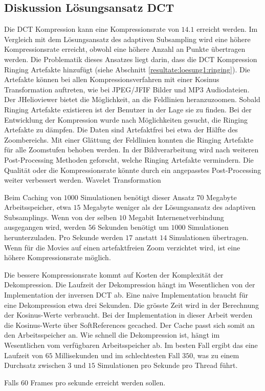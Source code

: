 \subsection{Diskussion Lösungsansatz DCT}
Die DCT Kompression kann eine Kompressionsrate von $14.1$ erreicht werden. Im Vergleich mit dem Lösungsansatz des adaptiven Subsampling wird eine höhere Kompressionsrate erreicht, obwohl eine höhere Anzahl an Punkte übertragen werden. Die Problematik dieses Ansatzes liegt darin, dass die DCT Kompression Ringing Artefakte hinzufügt (siehe Abschnitt \ref{resultate:loesung1:ringing}). Die Artefakte können bei allen Kompressionsverfahren mit einer Kosinus Transformation auftreten, wie bei JPEG/JFIF Bilder und MP3 Audiodateien. Der JHelioviewer bietet die Möglichkeit, an die Feldlinien heranzuzoomen. Sobald Ringing Artefakte existieren ist der Benutzer in der Lage sie zu finden. Bei der Entwicklung der Kompression wurde nach Möglichkeiten gesucht, die Ringing Artefakte zu dämpfen. Die Daten sind Artefaktfrei bei etwa der Hälfte des Zoombereichs. Mit einer Glättung der Feldlinien konnten die Ringing Artefakte für alle Zoomstufen behoben werden. In der Bildverarbeitung wird nach weiteren Post-Processing Methoden geforscht, welche Ringing Artefakte vermindern. Die Qualität oder die Kompressionsrate könnte durch ein angepasstes Post-Processing weiter verbessert werden. 
Wavelet Transformation

Beim Caching von $1000$ Simulationen benötigt dieser Ansatz $70$ Megabyte Arbeitsspeicher, etwa $15$ Megabyte weniger als der Lösungsansatz des adaptiven Subsamplings. Wenn von der selben $10$ Megabit Internenetverbindung ausgegangen wird, werden $56$ Sekunden benötigt um $1000$ Simulationen herunterzuladen. Pro Sekunde werden $17$ anstatt $14$ Simulationen übertragen. Wenn für die Movies auf einen artefaktfreien Zoom verzichtet wird, ist eine höhere Kompressionsrate möglich.

Die bessere Kompressionsrate kommt auf Kosten der Komplexität der Dekompression. Die Laufzeit der Dekompression hängt im Wesentlichen von der Implementation der inversen DCT ab. Eine naive Implementation braucht für eine Dekompression etwa drei Sekunden. Die grösste Zeit wird in der Berechnung der Kosinus-Werte verbraucht. Bei der Implementation in dieser Arbeit werden die Kosinus-Werte über SoftReferences gecached. Der Cache passt sich somit an den Arbeitsspeicher an. Wie schnell die Dekompression ist, hängt im Wesentlichen vom verfügbaren Arbeitsspeicher ab. Im besten Fall ergibt das eine Laufzeit von $65$ Millisekunden und im schlechtesten Fall $350$, was zu einem Durchsatz zwischen $3$ und $15$ Simulationen pro Sekunde pro Thread führt.


Falls 60 Frames pro sekunde erreicht werden sollen.